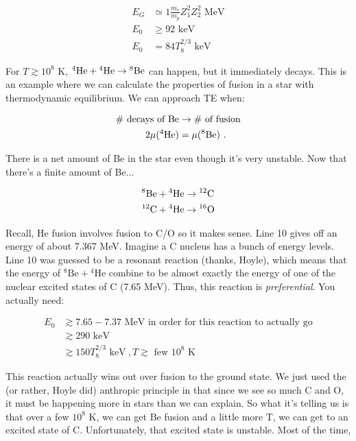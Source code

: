 \begin{align}
E_G &\simeq 1 \frac{m_r}{m_p}Z_1^2Z_2^2\textrm{ MeV}\\
E_0& \geq 92 \textrm{ keV}\\
E_0 &= 84 T_8^{2/3}\textrm{ keV}
\end{align}

For $T \gtrsim 10^8$ K, $\textrm{$^{4}$He}+\textrm{$^{4}$He} \rightarrow \textrm{$^{8}$Be}$ can happen, but it immediately decays. This is an example where we can calculate the properties of fusion in a star with thermodynamic equilibrium. We can approach TE when:

\begin{align}
\textrm{\# decays of Be}& \rightarrow \textrm{\# of fusion}\\
2\mu(^4\textrm{He}) &= \mu(^8\textrm{Be})~.
\end{align}

There is a net amount of Be in the star even though it's very unstable. Now that there's a finite amount of Be...

\begin{align}
\textrm{$^{8}$Be} + \textrm{$^{4}$He} &\rightarrow \textrm{$^{12}$C}\\
\textrm{$^{12}$C}+ \textrm{$^{4}$He}&\rightarrow \textrm{$^{16}$O}
\end{align}

Recall, He fusion involves fusion to C/O so it makes sense. Line 10 gives off an energy of about 7.367 MeV. Imagine a C nucleus has a bunch of energy levels. Line 10 was guessed to be a resonant reaction (thanks, Hoyle), which means that the energy of $\textrm{$^{8}$Be} + \textrm{$^{4}$He}$ combine to be almost exactly the energy of one of the nuclear excited states of C (7.65 MeV). Thus, this reaction is \textit{preferential}. You actually need:

\begin{align}
E_0 &\gtrsim 7.65 - 7.37\textrm{ MeV in order for this reaction to actually go}\\
&\gtrsim 290 \textrm{ keV}\\
&\gtrsim 150 T_8^{2/3} \textrm{ keV}~, T \gtrsim \textrm{ few $10^8$ K}
\end{align}

This reaction actually wins out over fusion to the ground state. We just used the (or rather, Hoyle did) anthropic principle in that since we see so much C and O, it must be happening more in stars than we can explain. So what it's telling us is that over a few $10^8$ K, we can get Be fusion and a little more T, we can get to an excited state of C. Unfortunately, that excited state is unstable. Most of the time,


